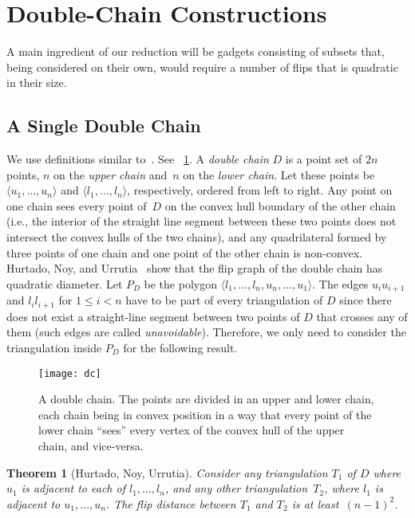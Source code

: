 \documentclass[11pt,a4paper]{article}
\newtheorem{theorem}{Theorem}
\begin{document}
\section{Double-Chain Constructions}
\label{sec_double_chain}
A main ingredient of our reduction will be gadgets consisting of subsets that, being considered on their own, would require a number of flips that is quadratic in their size.

\subsection{A Single Double Chain}

We use definitions similar to~\cite{poly_hard}.
See \figurename~\ref{fig_dc}.
A \emph{double chain} $D$ is a point set of $2n$ points, $n$ on the \emph{upper chain} and~$n$ on the \emph{lower chain}.
Let these points be $\langle u_1, \dots, u_n \rangle$ and $\langle l_1, \dots, l_n \rangle$, respectively, ordered from left to right.
Any point on one chain sees every point of~$D$ on the convex hull boundary of the other chain (i.e., the interior of the straight line segment between these two points does not intersect the convex hulls of the two chains), and any quadrilateral formed by three points of one chain and one point of the other chain is non-convex.
Hurtado, Noy, and Urrutia~\cite{hurtado_noy_urrutia} show that the flip graph of the double chain has quadratic diameter.
Let $P_D$ be the polygon $\langle l_1, \dots, l_n, u_n, \dots, u_1 \rangle$.
The edges $u_i u_{i+1}$ and $l_i l_{i+1}$ for $1 \leq i < n$ have to be part of every triangulation of $D$ since there does not exist a straight-line segment between two points of $D$ that crosses any of them (such edges are called \emph{unavoidable}).
Therefore, we only need to consider the triangulation inside $P_D$ for the following result.

\begin{figure}
\centering
\texttt{[image: dc]}
\caption{A double chain.
The points are divided in an upper and lower chain, each chain being in convex position in a way that every point of the lower chain ``sees'' every vertex of the convex hull of the upper chain, and vice-versa.}
\label{fig_dc}
\end{figure}


\begin{theorem}[Hurtado, Noy, Urrutia]\label{thm_dc}
Consider any triangulation $T_1$ of $D$ where $u_1$ is adjacent to each of $l_1,\dots,l_n$, and any other triangulation~$T_2$, where $l_1$ is adjacent to $u_1,\dots,u_n$.
The flip distance between $T_1$ and $T_2$ is at least~\mbox{$(n-1)^2$}.
\end{theorem}
\end{document}
